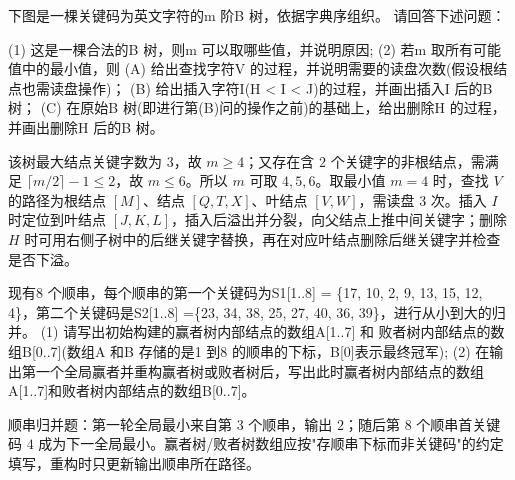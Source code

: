 \begin{question}[4 分]
下图是一棵关键码为英文字符的m 阶B 树，依据字典序组织。 请回答下述问题：

\begin{center}
\end{center}
(1) 这是一棵合法的B 树，则m 可以取哪些值，并说明原因;
(2) 若m 取所有可能值中的最小值，则
(A) 给出查找字符V 的过程，并说明需要的读盘次数(假设根结点也需读盘操作)；
(B) 给出插入字符I(H < I < J)的过程，并画出插入I 后的B 树；
(C) 在原始B 树(即进行第(B)问的操作之前)的基础上，给出删除H 的过程，并画出删除H 后的B 树。

\begin{solution}
该树最大结点关键字数为 $3$，故 $m\ge4$；又存在含 $2$ 个关键字的非根结点，需满足 $\lceil m/2\rceil-1\le2$，故 $m\le6$。所以 $m$ 可取 $4,5,6$。取最小值 $m=4$ 时，查找 $V$ 的路径为根结点 $[M]$、结点 $[Q,T,X]$、叶结点 $[V,W]$，需读盘 $3$ 次。插入 $I$ 时定位到叶结点 $[J,K,L]$，插入后溢出并分裂，向父结点上推中间关键字；删除 $H$ 时可用右侧子树中的后继关键字替换，再在对应叶结点删除后继关键字并检查是否下溢。
\end{solution}
\end{question}

\begin{question}[4 分]
现有8 个顺串，每个顺串的第一个关键码为S1[1..8] = \{17, 10, 2, 9, 13, 15, 12, 4\}，第二个关键码是S2[1..8] =\{23, 34, 38, 25, 27, 40, 36, 39\}，进行从小到大的归并。
(1) 请写出初始构建的赢者树内部结点的数组A[1..7] 和 败者树内部结点的数组B[0..7](数组A 和B 存储的是1 到8 的顺串的下标，B[0]表示最终冠军);
(2) 在输出第一个全局赢者并重构赢者树或败者树后，写出此时赢者树内部结点的数组A[1..7]和败者树内部结点的数组B[0..7]。

\begin{solution}
顺串归并题：第一轮全局最小来自第 3 个顺串，输出 $2$；随后第 8 个顺串首关键码 $4$ 成为下一全局最小。赢者树/败者树数组应按"存顺串下标而非关键码"的约定填写，重构时只更新输出顺串所在路径。
\end{solution}
\end{question}

